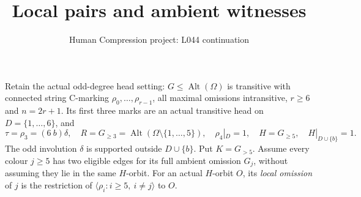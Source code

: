\documentclass[11pt,a4paper]{article}
\title{Local pairs and ambient witnesses}
\author{Human Compression project: L044 continuation}
\date{}
\newcommand{\gen}[1]{\langle#1\rangle}
\newcommand{\Alt}{\operatorname{Alt}}
\begin{document}
\maketitle
Retain the actual odd-degree head setting: $G\le\Alt(\Omega)$
is transitive with connected string C-marking
$\rho_0,\ldots,\rho_{r-1}$, all maximal omissions
intransitive, $r\ge6$ and $n=2r+1$. Its first three
marks are an actual transitive head on $D=\{1,\ldots,6\}$,
and
\[
 \tau=\rho_3=(6\ b)\delta,\quad
 R=G_{\ge3}=\Alt(\Omega\setminus\{1,\ldots,5\}),\quad
 \rho_4|_D=1,\quad H=G_{\ge5},\quad H|_{D\cup\{b\}}=1.
\]
The odd involution $\delta$ is supported outside $D\cup\{b\}$.
Put $K=G_{>5}$. Assume every colour $j\ge5$ has two
eligible edges for its full ambient omission $G_j$,
without assuming they lie in the same $H$-orbit.
For an actual $H$-orbit $O$, its \emph{local omission}
of $j$ is the restriction of
$\gen{\rho_i:i\ge5,\ i\ne j}$ to $O$.
\end{document}
